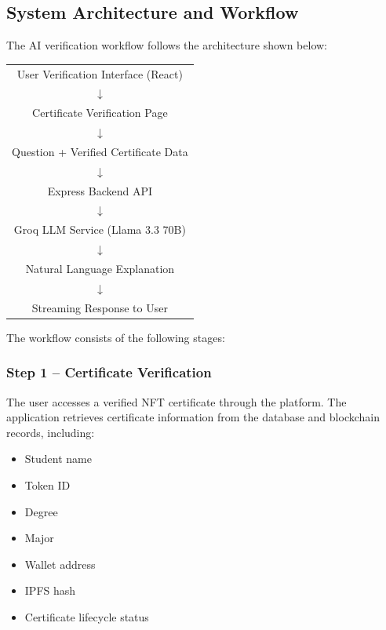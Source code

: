 \subsection{System Architecture and Workflow}

    The AI verification workflow follows the architecture shown below:

    \begin{center} 
        \begin{tabular}{c} 
            User Verification Interface (React)\\ 
            $\downarrow$ \\ 
            Certificate Verification Page 
            \\ $\downarrow$ \\ 
            Question + Verified Certificate Data \\ 
            $\downarrow$ \\ 
            Express Backend API \\ 
            $\downarrow$ \\ 
            Groq LLM Service (Llama 3.3 70B) 
            \\ $\downarrow$ \\ 
            Natural Language Explanation 
            \\ $\downarrow$ \\ 
            Streaming Response to User 
        \end{tabular} 
    \end{center}

    The workflow consists of the following stages:

    \subsubsection{Step 1 – Certificate Verification}

        The user accesses a verified NFT certificate through the platform. The application retrieves certificate information from the database and blockchain records, including:

            \begin{itemize}
                \item Student name
                \item Token ID
                \item Degree
                \item Major
                \item Wallet address
                \item IPFS hash
                \item Certificate lifecycle status
            \end{itemize}

